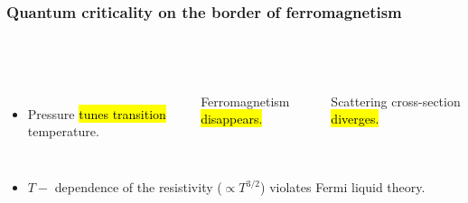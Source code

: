 
\begin{frame}[label=BorderFM2]
\frametitle{Quantum criticality on the border of ferromagnetism}

\vspace{-4ex}

\begin{columns}[t]
  
    \centerline{~}

  \begin{columns}[t]
      \centerline{~}
      \centerline{~}
    \end{columns}
\end{columns}

\begin{minipage}{\textwidth}
  \begin{columns}[t]
    \begin{itemize}
    \item<1->
      Pressure \hl{tunes transition} temperature.
    \end{itemize}
    \bi
    \item<2-> Ferro\-mag\-netism \hl{disappears.}
    \ei
    \bi
    \item<3-> Scattering cross-section \hl{diverges.}
    \ei
    
  \end{columns}
\end{minipage}

\begin{itemize}
\item<3->
$T-$ dependence of the resistivity ($\propto T^{3/2}$) violates Fermi liquid theory.
\end{itemize}
\end{frame}


